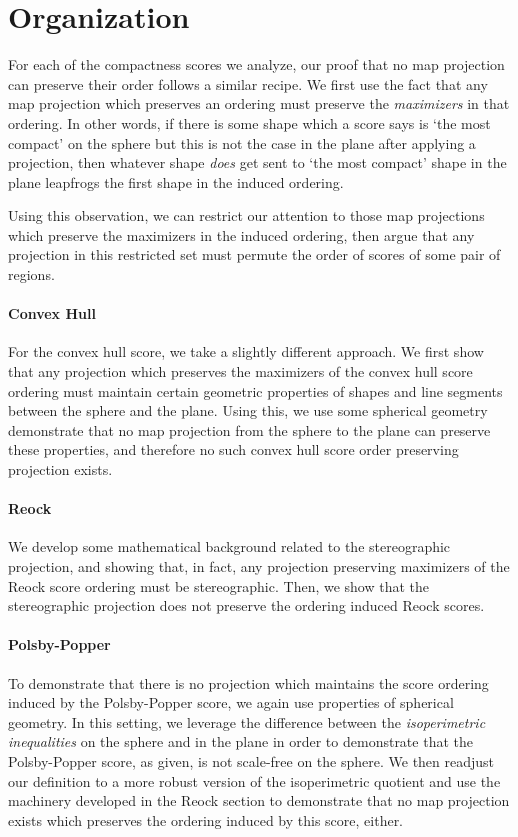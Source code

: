 \section{Organization}


For each of the compactness scores we analyze, our proof that no map
projection can preserve their order follows a similar recipe. We
first use the fact that any map projection which preserves an ordering
must preserve the \textit{maximizers} in that ordering.  In other words,
if there is some shape which a score says is `the most compact' on the sphere 
but this is not the case in the plane after applying a projection, then whatever 
shape \textit{does} get sent to `the most compact' shape in the plane leapfrogs 
the first shape in the induced ordering.

Using this observation, we can restrict our attention to those map
projections which preserve the maximizers in the induced ordering,
then argue that any projection in this restricted set must permute the
order of scores of some pair of regions.


\paragraph{Convex Hull}
For the convex hull score, we take a slightly different approach.  We first 
show that any projection which preserves the maximizers of the convex hull score 
ordering must maintain certain geometric properties of shapes and line segments 
between the sphere and the plane.  Using this, we use some spherical geometry demonstrate that no 
map projection from the sphere to the plane can preserve these properties, and therefore 
no such convex hull score order preserving projection exists.



\paragraph{Reock}
We  develop some mathematical background related to 
the   stereographic projection, and showing 
that, in fact, any projection preserving maximizers 
 of the Reock score ordering must be stereographic. 
Then, we show that the  stereographic 
projection does not preserve the ordering induced Reock scores. 




\paragraph{Polsby-Popper}
To demonstrate that there is no projection which maintains the score ordering induced by the Polsby-Popper score, we again use properties of spherical geometry.  In this setting, we leverage the 
difference between the \textit{isoperimetric inequalities} on the sphere and in the plane in order to 
demonstrate that the Polsby-Popper score, as given, is not scale-free on the sphere.  We then readjust 
our definition to a more robust version of the isoperimetric quotient and use the machinery developed 
in the Reock section to demonstrate that no map projection exists which preserves the ordering induced by this score, either.

